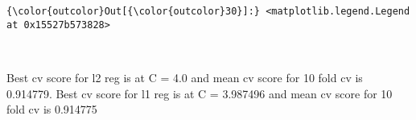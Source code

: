 \documentclass[11pt]{article}
\begin{document}
\begin{Verbatim}[commandchars=\\\{\}]
{\color{outcolor}Out[{\color{outcolor}30}]:} <matplotlib.legend.Legend at 0x15527b573828>
\end{Verbatim}
            
    \begin{center}
    \end{center}
    { \hspace*{\fill} \\}
    
    Best cv score for l2 reg is at C = 4.0 and mean cv score for 10 fold cv
is 0.914779. Best cv score for l1 reg is at C = 3.987496 and mean cv
score for 10 fold cv is 0.914775
\end{document}
